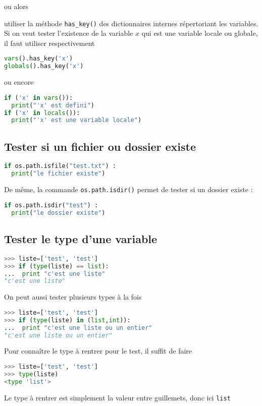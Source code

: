 \documentclass[a4paper,twoside]{article}
\begin{document}
ou alors

utiliser la méthode \texttt{has\_key()} des dictionnaires internes répertoriant les variables. Si on veut tester l'existence de la variable $x$  qui est une variable locale ou globale, il faut utiliser respectivement
\begin{lstlisting}[language=python]
vars().has_key('x')
globals().has_key('x')
\end{lstlisting}

ou encore
\begin{lstlisting}[language=python]
if ('x' in vars()):
  print("'x' est defini")
if ('x' in locals()):
  print("'x' est une variable locale")
\end{lstlisting}

\subsection{Tester si un fichier ou dossier existe}
\begin{lstlisting}[language=python]
if os.path.isfile("test.txt") :
  print("le fichier existe")
\end{lstlisting}

De même, la commande \verb|os.path.isdir()| permet de tester si un dossier existe :
\begin{lstlisting}[language=python]
if os.path.isdir("test") :
  print("le dossier existe")
\end{lstlisting}

\subsection{Tester le type d'une variable}\label{sec:test-type-variable}
\begin{lstlisting}[language=python]
>>> liste=['test', 'test']
>>> if (type(liste) == list):
...  print "c'est une liste"
"c'est une liste"
\end{lstlisting}

On peut aussi tester plusieurs types à la fois
\begin{lstlisting}[language=python]
>>> liste=['test', 'test']
>>> if (type(liste) in (list,int)):
...  print "c'est une liste ou un entier"
"c'est une liste ou un entier"
\end{lstlisting}

Pour connaître le type à rentrer pour le test, il suffit de faire
\begin{lstlisting}[language=python]
>>> liste=['test', 'test']
>>> type(liste)
<type 'list'>
\end{lstlisting}
Le type à rentrer est simplement la valeur entre guillemets, donc ici \texttt{list}
\end{document}
